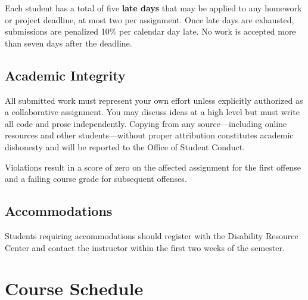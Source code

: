 \documentclass[
    language=english,
    doctype=syllabus,
    institution=none,
]{../../omnilatex}
\begin{document}
Each student has a total of five \textbf{late days} that may be applied to
any homework or project deadline, at most two per assignment.  Once late days
are exhausted, submissions are penalized 10\% per calendar day late.  No
work is accepted more than seven days after the deadline.

\subsection{Academic Integrity}

All submitted work must represent your own effort unless explicitly authorized
as a collaborative assignment.  You may discuss ideas at a high level but must
write all code and prose independently.  Copying from any source---including
online resources and other students---without proper attribution constitutes
academic dishonesty and will be reported to the Office of Student Conduct.

Violations result in a score of zero on the affected assignment for the first
offense and a failing course grade for subsequent offenses.

\subsection{Accommodations}

Students requiring accommodations should register with the Disability Resource
Center and contact the instructor within the first two weeks of the semester.

\section{Course Schedule}
\end{document}
